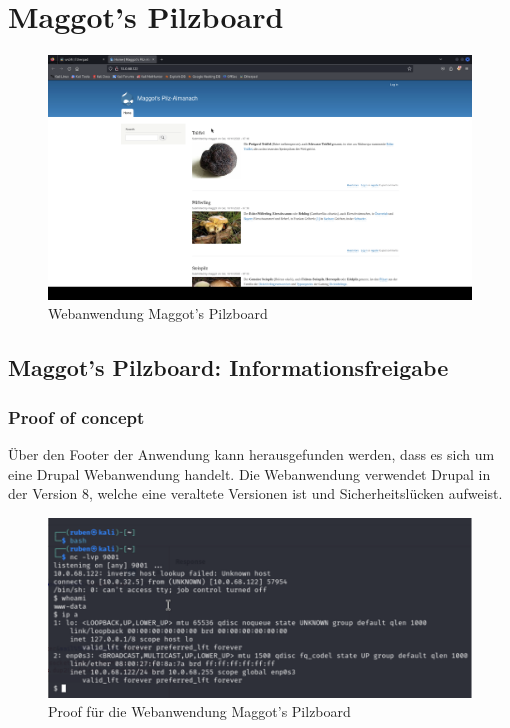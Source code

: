 \pagebreak
\chapter{Maggot's Pilzboard}

\begin{figure}[!ht]
    \centering
    \includegraphics[width=\linewidth]{images/screenshots/07_pilzboard.png}
    \caption{Webanwendung Maggot's Pilzboard}
    \label{fig:05_pilzboard}
\end{figure}
\newpage


\section{\makecvssbadge Maggot's Pilzboard: Informationsfreigabe}

\subsection*{Proof of concept}
Über den Footer der Anwendung kann herausgefunden werden, dass es sich um eine Drupal Webanwendung handelt. Die Webanwendung verwendet Drupal in der Version 8, welche eine veraltete Versionen ist und Sicherheitslücken aufweist.
\begin{figure}[!ht]
    \centering
    \includegraphics[width=\linewidth]{images/proofs/05_pilzboard_proof.png}
    \caption{Proof für die Webanwendung Maggot's Pilzboard}
    \label{fig:05_pilzboard_proof}
\end{figure}

